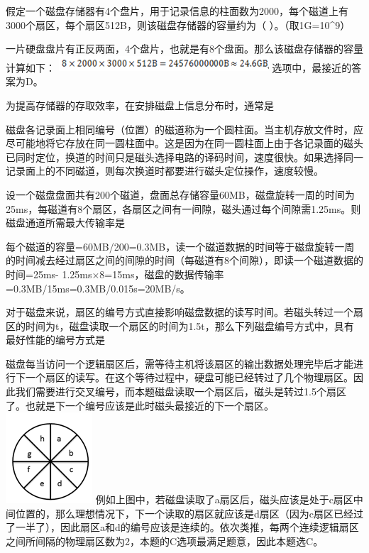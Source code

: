 \question 假定一个磁盘存储器有4个盘片，用于记录信息的柱面数为2000，每个磁道上有3000个扇区，每个扇区512B，则该磁盘存储器的容量约为（
）。（取1G=10\^{}9）
\par{}
\begin{solution}一片硬盘盘片有正反两面，4个盘片，也就是有8个盘面。那么该磁盘存储器的容量计算如下：
\includegraphics[width=3.08333in,height=0.22917in]{computerassets/475e8ad55ad674b91daa77dfdef019ad.png}
选项中，最接近的答案为D。
\end{solution}
\question 为提高存储器的存取效率，在安排磁盘上信息分布时，通常是
\par{}
\begin{solution}磁盘各记录面上相同编号（位置）的磁道称为一个圆柱面。当主机存放文件时，应尽可能地将它存放在同一圆柱面中。这是因为在同一圆柱面上由于各记录面的磁头已同时定位，换道的时间只是磁头选择电路的译码时间，速度很快。如果选择同一记录面上的不同磁道，则每次换道时都要进行磁头定位操作，速度较慢。
\end{solution}
\question 设一个磁盘盘面共有200个磁道，盘面总存储容量60MB，磁盘旋转一周的时间为25ms，每磁道有8个扇区，各扇区之间有一间隙，磁头通过每个间隙需1.25ms。则磁盘通道所需最大传输率是
\par{}
\begin{solution}每个磁道的容量=60MB/200=0.3MB，读一个磁道数据的时间等于磁盘旋转一周的时间减去经过扇区之间的间隙的时间（每磁道有8个间隙），即读一个磁道数据的时间=25ms-
1.25ms×8=15ms，磁盘的数据传输率=0.3MB/15ms=0.3MB/0.015s=20MB/s。
\end{solution}
\question 对于磁盘来说，扇区的编号方式直接影响磁盘数据的读写时间。若磁头转过一个扇区的时间为t，磁盘读取一个扇区的时间为1.5t，那么下列磁盘编号方式中，具有最好性能的编号方式是
\par\fourch{}{}{\textcolor{red}{}}{}
\begin{solution}磁盘每当访问一个逻辑扇区后，需等待主机将该扇区的输出数据处理完毕后才能进行下一个扇区的读写。在这个等待过程中，硬盘可能已经转过了几个物理扇区。因此我们需要进行交叉编号，而本题磁盘读取一个扇区后，磁头是转过1.5个扇区了。也就是下一个编号应该是此时磁头最接近的下一个扇区。
\includegraphics[width=1.27083in,height=1.33333in]{computerassets/67e305368a3f1c270fc41c3ae1aa9924.png}
例如上图中，若磁盘读取了a扇区后，磁头应该是处于c扇区中间位置的，那么理想情况下，下一个读取的扇区就应该是d扇区（因为c扇区已经过了一半了），因此扇区a和d的编号应该是连续的。依次类推，每两个连续逻辑扇区之间所间隔的物理扇区数为2，本题的C选项最满足题意，因此本题选C。
\end{solution}
